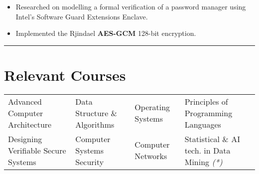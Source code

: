 \documentclass[10pt, margin=0.5in]{deedy-resume-openfont}
\begin{document}
\begin{minipage}[t]{0.48\textwidth}
\vspace{5pt}
\begin{itemize}[leftmargin=*, noitemsep]
  \item Researched on modelling a formal verification of a password manager using Intel's Software Guard Extensions Enclave.
  \item Implemented the Rjindael \textbf{AES-GCM} 128-bit encryption.
\end{itemize}
\end{minipage}

\vspace{2pt}				%
\rule{\textwidth}{0.5pt}	%
\vspace{-18pt}				%

\section{\hspace{0.5cm}Relevant Courses}
\hspace{-6pt} \begin{tabular*}{\textwidth}{llll}
Advanced Computer Architecture & Data Structure \& Algorithms & Operating Systems & Principles of Programming Languages \\
Designing Verifiable Secure Systems & Computer Systems Security & Computer Networks & Statistical \&
AI tech. in Data Mining \textit{(*)} \\
\end{tabular*}
\end{document}
